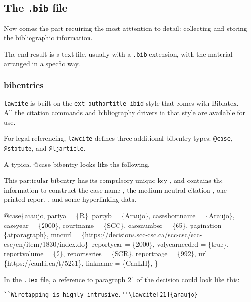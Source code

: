 \subsection{The \texttt{.bib} file}
Now comes the part requiring the most atttention to detail: collecting and storing the bibliographic information.

The end result is a text file, usually with a \texttt{.bib} extension, with the material arranged in a specfic way.

\subsubsection{bibentries}
\texttt{lawcite} is built on the \texttt{ext-authortitle-ibid} style that comes with Biblatex. All the citation commands and bibliography drivers in that style are available for use.

For legal referencing, \texttt{lawcite} defines three additional bibentry types: \texttt{@case}, \texttt{@statute}, and \texttt{@ljarticle}.

A typical @case bibentry looks like the following. 

This particular bibentry has its compulsory unique key , and contains the information to construct the case name , the medium neutral citation , one printed report , and some hyperlinking data.

\bigskip
{
\small
\ttfamily
\obeylines
@case\{araujo,	
			partya =  \{R\},	 
			partyb =  \{Araujo\},	 
			caseshortname =  \{Araujo\},	
			caseyear =  \{2000\},	 
			courtname =  \{SCC\},	 
			casenumber =  \{65\},	
			pagination =  \{atparagraph\},	
			mncurl =  \{https://decisions.scc-csc.ca/scc-csc/scc-csc/en/item/1830/index.do\},
			reportyear =  \{2000\},	 
			volyearneeded =  \{true\},  
			reportvolume =  \{2\},		
			reportseries =  \{SCR\}, 	
			reportpage =  \{992\},	   
			url =  \{https://canlii.ca/t/5231\},	
			linkname =  \{CanLII\},									
			\}
}

\bigskip
In the \texttt{.tex} file, a reference to paragraph 21 of the decision could look like this:

\begin{verbatim}
``Wiretapping is highly intrusive.''\lawcite[21]{araujo}
\end{verbatim}

